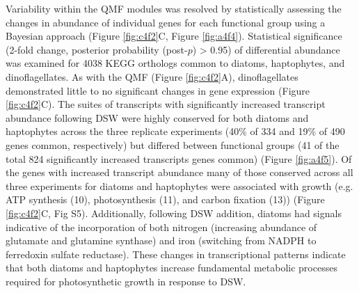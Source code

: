 Variability within the QMF modules was resolved by statistically assessing the changes in abundance of individual genes for each functional group using a Bayesian approach \citep{Wu2010} (Figure \ref{fig:c4f2}C, Figure \ref{fig:a4f4}). Statistical significance (2-fold change, posterior probability (post-$p$) > 0.95) of differential abundance was examined for 4038 KEGG orthologs common to diatoms, haptophytes, and dinoflagellates. As with the QMF (Figure \ref{fig:c4f2}A), dinoflagellates demonstrated little to no significant changes in gene expression (Figure \ref{fig:c4f2}C). The suites of transcripts with significantly increased transcript abundance following DSW were highly conserved for both diatoms and haptophytes across the three replicate experiments (40\% of 334 and 19\% of 490 genes common, respectively) but differed between functional groups (41 of the total 824 significantly increased transcripts genes common) (Figure \ref{fig:a4f5}). Of the genes with increased transcript abundance many of those conserved across all three experiments for diatoms and haptophytes were associated with growth (e.g. ATP synthesis (10), photosynthesis (11), and carbon fixation (13)) (Figure \ref{fig:c4f2}C, Fig S5). Additionally, following DSW addition, diatoms had signals indicative of the incorporation of both nitrogen (increasing abundance of glutamate and glutamine synthase) and iron (switching from NADPH to ferredoxin sulfate reductase). These changes in transcriptional patterns indicate that both diatoms and haptophytes increase fundamental metabolic processes required for photosynthetic growth in response to DSW. \par
